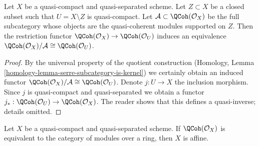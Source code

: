 \begin{lemma}
\label{lemma-quotient-supported-on-closed}
Let $X$ be a quasi-compact and quasi-separated scheme.
Let $Z \subset X$ be a closed subset such that $U = X \setminus Z$
is quasi-compact. Let $\mathcal{A} \subset \QCoh(\mathcal{O}_X)$
be the full subcategory whose objects are the quasi-coherent modules
supported on $Z$. Then the restriction functor
$\QCoh(\mathcal{O}_X) \to \QCoh(\mathcal{O}_U)$ induces
an equivalence $\QCoh(\mathcal{O}_X)/\mathcal{A} \cong \QCoh(\mathcal{O}_U)$.
\end{lemma}

\begin{proof}
By the universal property of the quotient construction
(Homology, Lemma \ref{homology-lemma-serre-subcategory-is-kernel})
we certainly obtain an induced functor
$\QCoh(\mathcal{O}_X)/\mathcal{A} \cong \QCoh(\mathcal{O}_U)$.
Denote $j : U \to X$ the inclusion morphism. Since $j$ is quasi-compact
and quasi-separated we obtain a functor
$j_* : \QCoh(\mathcal{O}_U) \to \QCoh(\mathcal{O}_X)$.
The reader shows that this defines a quasi-inverse; details omitted.
\end{proof}

\begin{lemma}
\label{lemma-characterize-affine}
Let $X$ be a quasi-compact and quasi-separated scheme.
If $\QCoh(\mathcal{O}_X)$ is equivalent to the category
of modules over a ring, then $X$ is affine.
\end{lemma}

